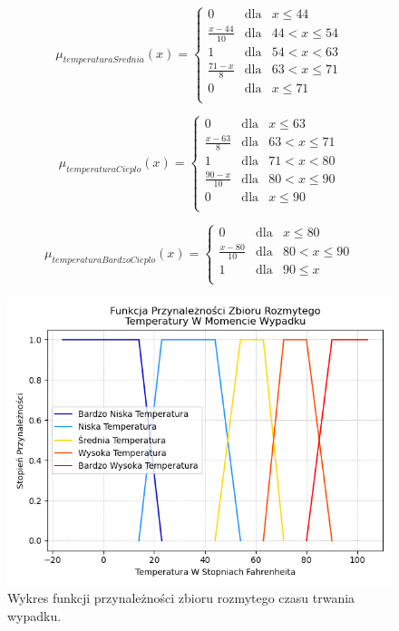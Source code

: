 \documentclass{classrep}
\begin{document}
\begin{equation}
\mu _{temperaturaSrednia}(x) =  \left\{ \begin{array}{rcl}
 0 & \mbox{dla} & x  \leq 44 \\
\frac{x - 44}{10} & \mbox{dla} & 44 < x \leq 54\\
1 & \mbox{dla} & 54 < x < 63\\
\frac{71 - x}{8} & \mbox{dla} & 63 < x \leq 71\\
 0 & \mbox{dla} & x  \leq 71 \\
\end{array}\right.
\end{equation}

\begin{equation}
\mu _{temperaturaCieplo}(x) =  \left\{ \begin{array}{rcl}
 0 & \mbox{dla} & x  \leq 63 \\
\frac{x - 63}{8} & \mbox{dla} & 63 < x \leq 71\\
1 & \mbox{dla} & 71 < x < 80\\
\frac{90 - x}{10} & \mbox{dla} & 80 < x \leq 90\\
 0 & \mbox{dla} & x  \leq 90 \\
\end{array}\right.
\end{equation}

\begin{equation}
\mu _{temperaturaBardzoCieplo}(x) =  \left\{ \begin{array}{rcl}
 0 & \mbox{dla} & x \leq 80 \\
\frac{x - 80}{10} & \mbox{dla} & 80 < x \leq 90\\
1 & \mbox{dla} & 90 \leq x\\
\end{array}\right.
\end{equation}

\begin{figure}[h!]
 \centering
 \includegraphics[width=14cm]{FunkcjaPrzynaleznosciTemperatura.png}
 \vspace{-0.3cm}
 \caption{Wykres funkcji przynależności zbioru rozmytego czasu trwania wypadku. }
 \label{rysunek do eksperymentu 1 wariantu 1}
\end{figure}
\newpage
\end{document}
